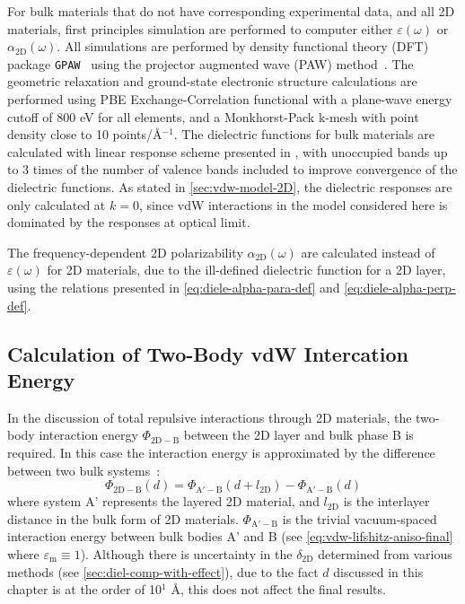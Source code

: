 For bulk materials that do not have corresponding experimental data,
and all 2D materials, first principles simulation are performed to
computer either $\varepsilon(\omega)$ or
$\alpha_{\mathrm{2D}}(\omega)$. All simulations are performed by
density functional theory (DFT) package \texttt{GPAW}~\cite{Mortensen_2005_gpaw}
using the projector augmented wave (PAW)
method~\cite{Blochl_1994_PW}.
%
The geometric relaxation and ground-state electronic structure
calculations are performed using PBE Exchange-Correlation
functional\cite{Perdew_1996_GGA} with a plane-wave energy
cutoff of 800 eV for all elements, and a Monkhorst-Pack k-mesh with
point density close to 10 points/\AA{}$^{-1}$.
%
The dielectric functions for bulk materials are calculated with linear
response scheme presented in \cite{Gajdos_2006_opt_PAW}, with
unoccupied bands up to 3 times of the number of valence bands included
to improve convergence of the dielectric functions.
%
As stated in \autoref{sec:vdw-model-2D}, the dielectric responses are
only calculated at $k = 0$, since vdW interactions in the model
considered here is dominated by the responses at optical limit.

The frequency-dependent 2D polarizability
$\alpha_{\mathrm{2D}}(\omega)$ are calculated instead of
$\varepsilon(\omega)$ for 2D materials, due to the ill-defined
dielectric function for a 2D layer, using the relations presented in
\autoref{eq:diele-alpha-para-def} and
\autoref{eq:diele-alpha-perp-def}.

\subsection*{Calculation of Two-Body vdW Intercation Energy}
\label{sec:calculation-two-body}

In the discussion of total repulsive interactions through 2D
materials, the two-body interaction energy $\Phi_{\mathrm{2D-B}}$
between the 2D layer and bulk phase B is required. In this case the
interaction energy is approximated by the difference between two bulk
systems~\cite{parsegian_van_2010_book}:
\begin{equation}
  \label{eq:vdw-phi-2D-B}
  \Phi_{\mathrm{2D - B}}(d) = \Phi_{\mathrm{A'-B}}(d + l_{\mathrm{2D}}) - \Phi_{\mathrm{A'-B}}(d)
\end{equation}
where system A' represents the layered 2D material, and
$l_{\mathrm{2D}}$ is the inter\-layer distance in the bulk form
of 2D materials. $\Phi_{\mathrm{A'-B}}$ is the trivial vacuum-spaced
interaction energy between bulk bodies A' and B (see
\autoref{eq:vdw-lifshitz-aniso-final} where
$\varepsilon_{\mathrm{m}} \equiv 1$).
%
Although there is uncertainty in the $\delta_{\mathrm{2D}}$ determined
from various methods (see \autoref{sec:diel-comp-with-effect}), due to
the fact $d$ discussed in this chapter is at the order of 10$^{1}$
\AA{}, this does not affect the final results.

